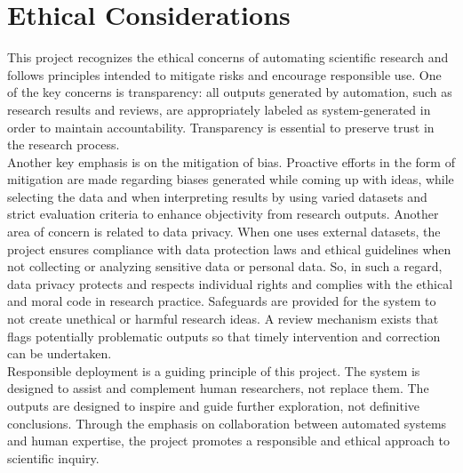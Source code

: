 \section{Ethical Considerations}
This project recognizes the ethical concerns of automating scientific research and follows principles intended to mitigate risks and encourage responsible use. One of the key concerns is transparency: all outputs generated by automation, such as research results and reviews, are appropriately labeled as system-generated in order to maintain accountability. Transparency is essential to preserve trust in the research process.\\
Another key emphasis is on the mitigation of bias. Proactive efforts in the form of mitigation are made regarding biases generated while coming up with ideas, while selecting the data and when interpreting results by using varied datasets and strict evaluation criteria to enhance objectivity from research outputs.
Another area of concern is related to data privacy. When one uses external datasets, the project ensures compliance with data protection laws and ethical guidelines when not collecting or analyzing sensitive data or personal data. So, in such a regard, data privacy protects and respects individual rights and complies with the ethical and moral code in research practice. Safeguards are provided for the system to not create unethical or harmful research ideas. A review mechanism exists that flags potentially problematic outputs so that timely intervention and correction can be undertaken.\\
Responsible deployment is a guiding principle of this project. The system is designed to assist and complement human researchers, not replace them. The outputs are designed to inspire and guide further exploration, not definitive conclusions. Through the emphasis on collaboration between automated systems and human expertise, the project promotes a responsible and ethical approach to scientific inquiry.

